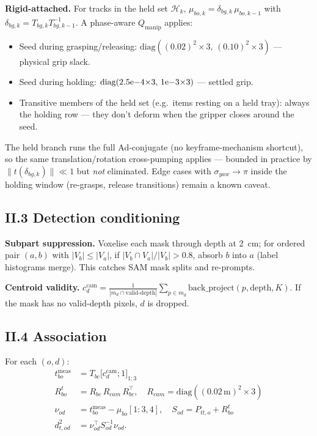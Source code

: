 \documentclass[11pt]{article}
\begin{document}
\textbf{Rigid-attached.} For tracks in the held set $\mathcal{H}_k$,
$\mu_{bo,k} = \delta_{bg,k}\,\mu_{bo,k-1}$ with
$\delta_{bg,k} = T_{bg,k}T_{bg,k-1}^{-1}$. A phase-aware $Q_{\text{manip}}$
applies:
\begin{itemize}[leftmargin=1.5em,itemsep=0pt,topsep=2pt]
\item Seed during grasping/releasing: $\mathrm{diag}((0.02)^2{\times}3,\,(0.10)^2{\times}3)$ --- physical grip slack.
\item Seed during holding: $\mathrm{diag}(2.5{\rm e}{-}4{\times}3,\,1{\rm e}{-}3{\times}3)$ --- settled grip.
\item Transitive members of the held set (e.g.\ items resting on a held tray): always the holding row --- they don't deform when the gripper closes around the seed.
\end{itemize}
The held branch runs the full Ad-conjugate (no keyframe-mechanism shortcut),
so the same translation/rotation cross-pumping applies --- bounded in
practice by $\|t(\delta_{bg,k})\|\!\ll\!1$ but \emph{not} eliminated. Edge
cases with $\sigma_{yaw}\!\to\!\pi$ inside the holding window (re-grasps,
release transitions) remain a known caveat.

\subsection*{II.3 Detection conditioning}

\textbf{Subpart suppression.} Voxelise each mask through depth at 2~cm; for
ordered pair $(a,b)$ with $|V_b|\le|V_a|$, if $|V_b\cap V_a|/|V_b|>0.8$,
absorb $b$ into $a$ (label histograms merge). This catches SAM mask splits
and re-prompts.

\textbf{Centroid validity.}
$c_d^{\text{cam}} = \frac{1}{|m_d\cap\text{valid-depth}|}\sum_{p\in m_d}\mathrm{back\_project}(p,\mathrm{depth},K)$.
If the mask has no valid-depth pixels, $d$ is dropped.

\subsection*{II.4 Association}

For each $(o,d)$:
\begin{align*}
  t_{bo}^{\text{meas}} &= T_{bc}\bigl[c_d^{\text{cam}}; 1\bigr]_{1:3} \\
  R_{bo}^t &= R_{bc}\,R_{cam}\,R_{bc}^\top, \quad R_{cam} = \mathrm{diag}((0.02\,\mathrm{m})^2{\times}3) \\
  \nu_{od} &= t_{bo}^{\text{meas}} - \mu_{bo}[1{:}3, 4],\quad
  S_{od} = P_{tt,o} + R_{bo}^t \\
  d^2_{t,od} &= \nu_{od}^\top S_{od}^{-1} \nu_{od}.
\end{align*}
\end{document}
